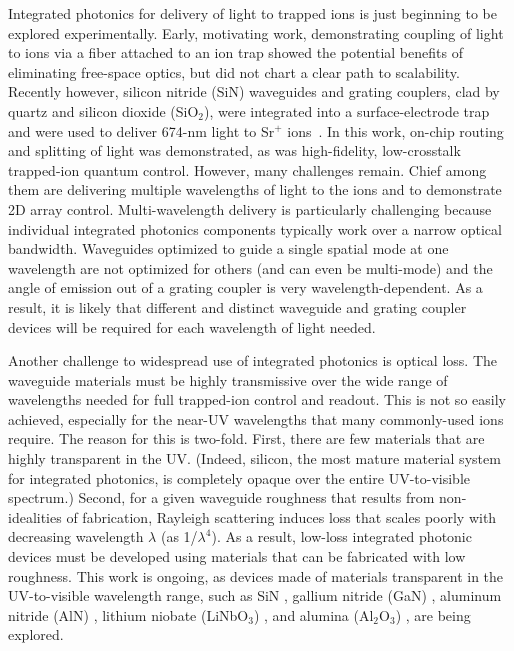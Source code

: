 \documentclass[%
reprint,
 amsmath,amssymb,
]{revtex4-1}
\begin{document}
Integrated photonics for delivery of light to trapped ions is just beginning to be explored experimentally.  Early, motivating work, demonstrating coupling of light to ions via a fiber attached to an ion trap \cite{KimIntFiberTrap2011} showed the potential benefits of eliminating free-space optics, but did not chart a clear path to scalability.   Recently however, silicon nitride (SiN) waveguides and grating couplers, clad by quartz and silicon dioxide (SiO$_2$), were integrated into a surface-electrode trap and were used to deliver 674-nm light to Sr$^+$ ions~\cite{MehtaIntegrated2016}.  In this work, on-chip routing and splitting of light was demonstrated, as was high-fidelity, low-crosstalk trapped-ion quantum control.  However, many challenges remain. Chief among them are delivering multiple wavelengths of light to the ions and to demonstrate 2D array control.  Multi-wavelength delivery is particularly challenging because individual integrated photonics components typically work over a narrow optical bandwidth. Waveguides optimized to guide a single spatial mode at one wavelength are not optimized for others (and can even be multi-mode) and the angle of emission out of a grating coupler is very wavelength-dependent.  As a result, it is likely that different and distinct waveguide and grating coupler devices will be required for each wavelength of light needed.

Another challenge to widespread use of integrated photonics is optical loss.  The waveguide materials must be highly transmissive over the wide range of wavelengths needed for full trapped-ion control and readout.  This is not so easily achieved, especially for the near-UV wavelengths that many commonly-used ions require.  The reason for this is two-fold.  First, there are few materials that are highly transparent in the UV. (Indeed, silicon, the most mature material system for integrated photonics, is completely opaque over the entire UV-to-visible spectrum.)  Second, for a given waveguide roughness that results from non-idealities of fabrication, Rayleigh scattering induces loss that scales poorly with decreasing wavelength $\lambda$ (as 1/$\lambda^4$). As a result, low-loss integrated photonic devices must be developed using materials that can be fabricated with low roughness.  This work is ongoing, as devices made of materials transparent in the UV-to-visible wavelength range, such as SiN \cite{SoraceAgaskarSPIE2018}, gallium nitride (GaN) \cite{XiongGaN2011}, aluminum nitride (AlN) \cite{XiongAlN2012, LuAlN2018, LiuUVAlN2018}, lithium niobate (LiNbO$_3$) \cite{ZhangLiNbO32017}, and alumina (Al$_2$O$_3$) \cite{WestAl2O32018}, are being explored.
\end{document}
